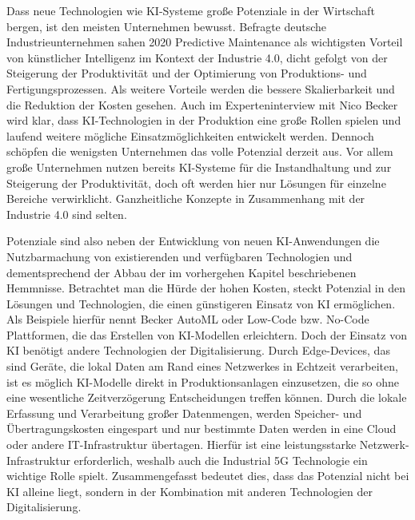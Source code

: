 \documentclass[a4paper,12pt, german]{report}
\begin{document}
Dass neue Technologien wie KI-Systeme große Potenziale in der Wirtschaft bergen, ist den meisten Unternehmen bewusst. Befragte deutsche Industrieunternehmen sahen 2020 Predictive Maintenance als wichtigsten Vorteil von künstlicher Intelligenz im Kontext der Industrie 4.0, dicht gefolgt von der Steigerung der Produktivität und der Optimierung von Produktions- und Fertigungsprozessen. Als weitere Vorteile werden die bessere Skalierbarkeit und die Reduktion der Kosten gesehen.\cite{28} \newline Auch im Experteninterview mit Nico Becker wird klar, dass KI-Technologien in der Produktion eine große Rollen spielen und laufend weitere mögliche Einsatzmöglichkeiten entwickelt werden. Dennoch schöpfen die wenigsten Unternehmen das volle Potenzial derzeit aus. Vor allem große Unternehmen nutzen bereits KI-Systeme für die Instandhaltung und zur Steigerung der Produktivität, doch oft werden hier nur Lösungen für einzelne Bereiche verwirklicht. Ganzheitliche Konzepte in Zusammenhang mit der Industrie 4.0 sind selten.\cite{02}

Potenziale sind also neben der Entwicklung von neuen KI-Anwendungen die Nutzbarmachung von existierenden und verfügbaren Technologien und dementsprechend der Abbau der im vorhergehen Kapitel beschriebenen Hemmnisse. Betrachtet man die Hürde der hohen Kosten, steckt Potenzial in den Lösungen und Technologien, die einen günstigeren Einsatz von KI ermöglichen. Als Beispiele hierfür nennt Becker AutoML oder Low-Code bzw. No-Code Plattformen, die das Erstellen von KI-Modellen erleichtern. Doch der Einsatz von KI benötigt andere Technologien der Digitalisierung. Durch Edge-Devices, das sind Geräte, die lokal Daten am Rand eines Netzwerkes in Echtzeit verarbeiten, ist es möglich KI-Modelle direkt in Produktionsanlagen einzusetzen, die so ohne eine wesentliche Zeitverzögerung Entscheidungen treffen können.\cite{41} Durch die lokale Erfassung und Verarbeitung großer Datenmengen, werden Speicher- und Übertragungskosten eingespart und nur bestimmte Daten werden in eine Cloud oder andere IT-Infrastruktur übertagen. Hierfür ist eine leistungsstarke Netzwerk-Infrastruktur erforderlich, weshalb auch die Industrial 5G Technologie ein wichtige Rolle spielt.\cite{36} Zusammengefasst bedeutet dies, dass das Potenzial nicht bei KI alleine liegt, sondern in der Kombination mit anderen Technologien der Digitalisierung.
\end{document}
